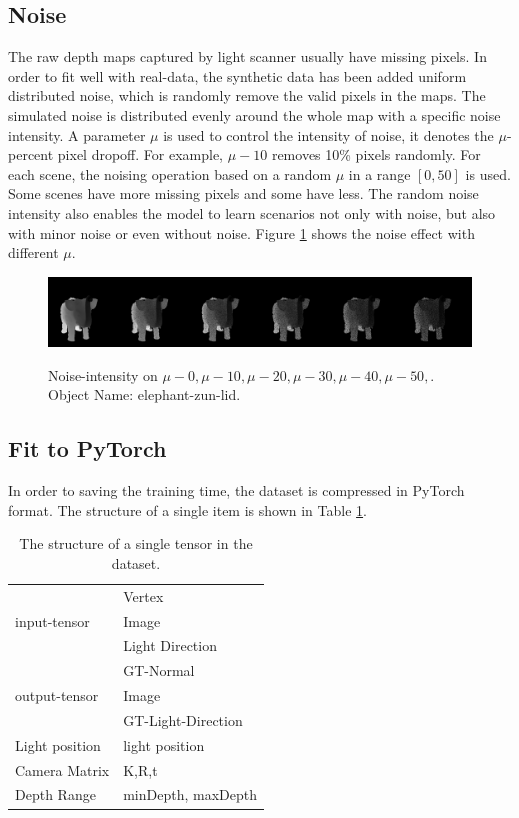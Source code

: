 \subsection{Noise}
\label{sec:noise}
The raw depth maps captured by light scanner usually have missing pixels. In order to fit well with real-data, the synthetic data has been added uniform distributed noise, which is randomly remove the valid pixels in the maps.
The simulated noise is distributed evenly around the whole map with a specific noise intensity. A parameter $ \mu $ is used to control the intensity of noise, it denotes the $ \mu $-percent pixel dropoff. For example, $ \mu-10 $ removes 10\% pixels randomly. For each scene, the noising operation based on a random $ \mu $ in a range $ \left[0, 50\right]  $ is used. Some scenes have more missing pixels and some have less. The random noise intensity also enables the model to learn scenarios not only with noise, but also with minor noise or even without noise.
Figure \ref{fig:noise-intensity} shows the noise effect with different $ \mu $.
\begin{figure}[!h]
	\centering
	{\includegraphics[width=.9\textwidth]{./Figures/add_noise_depth.png}}
	\decoRule
	\caption{Noise-intensity on $ \mu-0, \mu-10,\mu-20, \mu-30, \mu-40, \mu-50,$. Object Name: elephant-zun-lid.}
	\label{fig:noise-intensity}
\end{figure}


\subsection{Fit to PyTorch}
In order to saving the training time, the dataset is compressed in PyTorch format. The structure of a single item is shown in Table \ref{tab:tensor-structure}.
\begin{table}[H]
	\caption{The structure of a single tensor in the dataset.}
	\label{tab:tensor-structure}
	\centering
	\begin{tabular}{l | l}
		\toprule
		\tabhead{Name} & \tabhead{Content} \\
		\midrule
		\multirow{3}{*}{input-tensor}  & Vertex \\  & Image \\  & Light Direction \\
		\hline
		\multirow{3}{*}{output-tensor}  & GT-Normal \\ & Image \\ & GT-Light-Direction \\
		\hline
		Light position & light position \\
		\hline 
		Camera Matrix  & K,R,t\\
		\hline 
		Depth Range  & minDepth, maxDepth\\
		\bottomrule
	\end{tabular}
\end{table}
